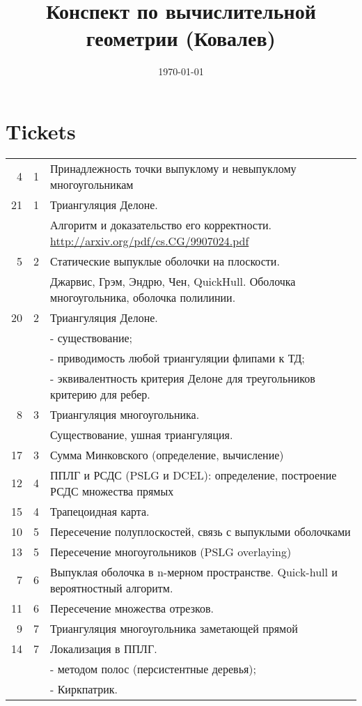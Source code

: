 \documentclass[11pt]{article}
\date{\today}
\title{Конспект по вычислительной геометрии (Ковалев)}
\begin{document}
\maketitle
\tableofcontents


\section{Tickets}
\label{sec-1}
\begin{center}
\begin{tabular}{rrl}
4 & 1 & Принадлежность точки выпуклому и невыпуклому многоугольникам\\
21 & 1 & Триангуляция Делоне.\\
 &  & Алгоритм и доказательство его корректности.        \url{http://arxiv.org/pdf/cs.CG/9907024.pdf}\\
5 & 2 & Статические выпуклые оболочки на плоскости.\\
 &  & Джарвис, Грэм, Эндрю, Чен, QuickHull. Оболочка многоугольника, оболочка полилинии.\\
20 & 2 & Триангуляция Делоне.\\
 &  & - существование;\\
 &  & - приводимость любой триангуляции флипами к ТД;\\
 &  & - эквивалентность критерия Делоне для треугольников критерию для ребер.\\
8 & 3 & Триангуляция многоугольника.\\
 &  & Существование, ушная триангуляция.\\
17 & 3 & Сумма Минковского (определение, вычисление)\\
12 & 4 & ППЛГ и РСДС (PSLG и DCEL): определение, построение РСДС множества прямых\\
15 & 4 & Трапецоидная карта.\\
10 & 5 & Пересечение полуплоскостей, связь с выпуклыми оболочками\\
13 & 5 & Пересечение многоугольников (PSLG overlaying)\\
7 & 6 & Выпуклая оболочка в n-мерном пространстве. Quick-hull и вероятностный алгоритм.\\
11 & 6 & Пересечение множества отрезков.\\
9 & 7 & Триангуляция многоугольника заметающей прямой\\
14 & 7 & Локализация в ППЛГ.\\
 &  & - методом полос (персистентные деревья);\\
 &  & - Киркпатрик.\\

\end{tabular}
\end{center}
\end{document}
